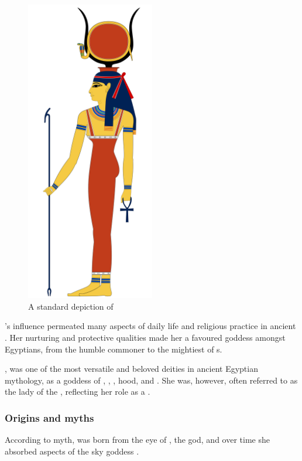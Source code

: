 \begin{figure} [H]
	\centering
	\includegraphics[width=0.5\textwidth]{../images/hathor}
	\caption{A standard depiction of }
\end{figure}

's influence permeated many aspects of daily life and religious practice in ancient . Her nurturing and protective qualities made her a favoured goddess amongst Egyptians, from the humble commoner to the mightiest of s.

, was one of the most versatile and beloved deities in ancient Egyptian mythology, as a goddess of , , , hood, and . She was, however, often referred to as the lady of the , reflecting her role as a .

\subsubsection*{Origins and myths}

According to myth,  was born from the eye of , the  god, and over time she absorbed aspects of the sky goddess .

